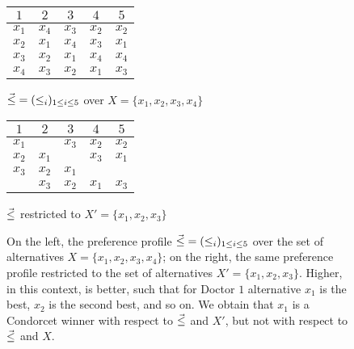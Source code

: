 \begin{figure}\centering
	\begin{minipage}{0.45\textwidth}\centering
		\begin{tabular}{ccccc}
			\toprule
			$1$ & $2$ & $3$ & $4$ & $5$\\
			\midrule
			$x_1$ & $x_4$ & $x_3$ & $x_2$ &	$x_2$\\
			$x_2$ & $x_1$ & $x_4$ & $x_3$ &	$x_1$\\ 	
			$x_3$ & $x_2$ & $x_1$ & $x_4$ &	$x_4$\\ 	
			$x_4$ & $x_3$ & $x_2$ & $x_1$ &	$x_3$\\\bottomrule 	
		\end{tabular}
		\caption*{${\vec{\le}}=(\le_i)_{1\le i \le 5}$ over $X = \{x_1,x_2,x_3,x_4\}$}
	\end{minipage}
	\begin{minipage}{0.45\textwidth}\centering
		\begin{tabular}{ccccc}
			\toprule
			$1$ & $2$ & $3$ & $4$ & $5$\\
			\midrule
			$x_1$ &       & $x_3$ & $x_2$ &	$x_2$\\
			$x_2$ & $x_1$ &       & $x_3$ &	$x_1$\\ 	
			$x_3$ & $x_2$ & $x_1$ &       &	     \\ 	
			      & $x_3$ & $x_2$ & $x_1$ &	$x_3$\\
			\bottomrule 	
		\end{tabular}
		\caption*{${\vec{\le}}$ restricted to $X' = \{x_1,x_2,x_3\}$}
	\end{minipage}
	\caption{
		On the left, the preference profile ${\vec{\le}}=(\le_i)_{1\le i \le 5}$
		over the set of alternatives $X = \{x_1,x_2,x_3,x_4\}$;
		on the right, the same preference profile restricted
		to the set of alternatives $X'=\{x_1,x_2,x_3\}$.
		Higher, in this context, is better, such that for Doctor $1$
		alternative $x_1$ is the best, $x_2$ is the second best, and so on.
		We obtain that $x_1$ is a Condorcet winner with respect to ${\vec{\le}}$ and $X'$,
		but not with respect to ${\vec{\le}}$ and $X$.
		}
	\label{fig:2-condorcet-winner-expansion}
\end{figure}		

